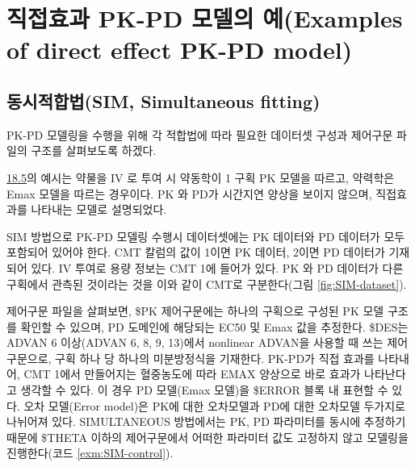 \documentclass[
  11pt,
  krantz2,
  a4paper]{krantz}
\theoremstyle{definition}
\theoremstyle{definition}
\theoremstyle{definition}
\theoremstyle{remark}
\begin{document}
\hypertarget{direct-pkpd}{%
\section{직접효과 PK-PD 모델의 예(Examples of direct effect PK-PD model)}\label{direct-pkpd}}


\hypertarget{uxb3d9uxc2dcuxc801uxd569uxbc95sim-simultaneous-fitting}{%
\subsection{동시적합법(SIM, Simultaneous fitting)}\label{uxb3d9uxc2dcuxc801uxd569uxbc95sim-simultaneous-fitting}}


PK-PD 모델링을 수행을 위해 각 적합법에 따라 필요한 데이터셋 구성과 제어구문 파일의 구조를 살펴보도록 하겠다.

\protect\hyperlink{direct-pkpd}{18.5}의 예시는 약물을 IV 로 투여 시 약동학이 1 구획 PK 모델을 따르고, 약력학은 Emax 모델을 따르는 경우이다. PK 와 PD가 시간지연 양상을 보이지 않으며, 직접효과를 나타내는 모델로 설명되었다.

SIM 방법으로 PK-PD 모델링 수행시 데이터셋에는 PK 데이터와 PD 데이터가 모두 포함되어 있어야 한다. CMT 칼럼의 값이 1이면 PK 데이터, 2이면 PD 데이터가 기재되어 있다. IV 투여로 용량 정보는 CMT 1에 들어가 있다. PK 와 PD 데이터가 다른 구획에서 관측된 것이라는 것을 이와 같이 CMT로 구분한다(그림 \ref{fig:SIM-dataset}).

제어구문 파일을 살펴보면, \$PK 제어구문에는 하나의 구획으로 구성된 PK 모델 구조를 확인할 수 있으며, PD 도메인에 해당되는 EC50 및 Emax 값을 추정한다. \$DES는 ADVAN 6 이상(ADVAN 6, 8, 9, 13)에서 nonlinear ADVAN을 사용할 때 쓰는 제어구문으로, 구획 하나 당 하나의 미분방정식을 기재한다. PK-PD가 직접 효과를 나타내어, CMT 1에서 만들어지는 혈중농도에 따라 EMAX 양상으로 바로 효과가 나타난다고 생각할 수 있다. 이 경우 PD 모델(Emax 모델)을 \$ERROR 블록 내 표현할 수 있다. 오차 모델(Error model)은 PK에 대한 오차모델과 PD에 대한 오차모델 두가지로 나뉘어져 있다. SIMULTANEOUS 방법에서는 PK, PD 파라미터를 동시에 추정하기 때문에 \$THETA 이하의 제어구문에서 어떠한 파라미터 값도 고정하지 않고 모델링을 진행한다(코드 \ref{exm:SIM-control}).
\end{document}
